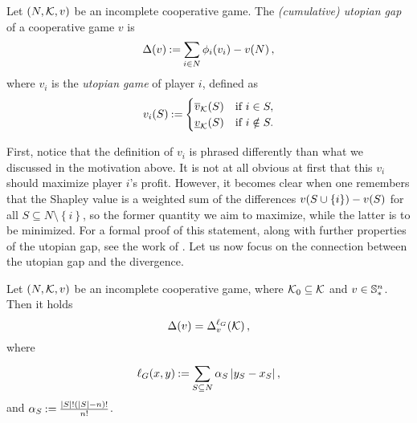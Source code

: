 \begin{defi}
  \label{def:gap}
  Let $ \left( N, \k, v \right) $ be an incomplete cooperative game.
  The \emph{(cumulative) utopian gap} of a cooperative game $ v $ is \[
    \gap v \deq \sum_{i \in N} \shapley[i] {v_i} - \fce{v}{N},
  \]
  where $ v_i $ is the \emph{utopian game} of player $ i $, defined as \[
    \fce{v_i}{S} \deq \begin{cases}
      \fce{\uf v}{S} & \text{if } i \in S, \\
      \fce{\lf v}{S} & \text{if } i \notin S.
    \end{cases}
  \]
\end{defi}

First, notice that the definition of $ v_i $ is phrased differently than what we discussed in the motivation above.
It is not at all obvious at first that this $ v_i $ should maximize player $ i $'s profit.
However, it becomes clear when one remembers that the Shapley value is a weighted sum of the differences $ \fce{v}{S \cup \left\{ i \right\}} - \fce{v}{S} $ for all $ S \subseteq N \setminus \left\{ i \right\} $, so the former quantity we aim to maximize, while the latter is to be minimized.
For a formal proof of this statement, along with further properties of the utopian gap, see the work of \cite{uradnik2024reducing}.
Let us now focus on the connection between the utopian gap and the divergence.

\begin{prop}
  Let $ \left( N, \k, v \right) $ be an incomplete cooperative game, where $ \k_0 \subseteq \k $ and $ v \in \cSp $.
  Then it holds \[
    \gap v = \divg[v] {\ell_G}\k,
  \]
  where \begin{equation}
    \label{eq:gap_divg}
    \fce{\ell_G}{x,y} \deq \sum_{S \subseteq N}^{} \alpha_S \absolute{y_S-x_S},
  \end{equation}
  and $ \alpha_S \deq \frac{\absolute{S}! \left( \absolute{S} - n \right)!}{n!} $.
\end{prop}

